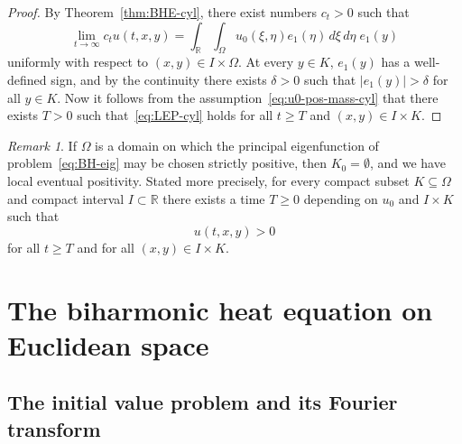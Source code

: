 \documentclass[a4paper, reqno,titlepage]{amsart}
\numberwithin{equation}{section}
\theoremstyle{plain}
\theoremstyle{definition}
\theoremstyle{remark}
\newtheorem{remark}[theorem]{Remark}
\newcommand{\RR}{\mathbb{R}}
\begin{document}
\begin{proof}
  By Theorem~\ref{thm:BHE-cyl}, there exist numbers $c_t > 0$ such that
  \begin{displaymath}
    \lim_{t \to \infty} c_t u(t,x,y) = \int_\RR \int_\Omega u_0(\xi, \eta) e_1(\eta) \,d\xi \,d\eta \; e_1(y)
  \end{displaymath}
  uniformly with respect to $(x,y) \in I \times \Omega$. At every $y \in K$, $e_1(y)$ has a well-defined sign, and by the continuity there exists $\delta>0$ such that $|e_1(y)|>\delta$ for all $y\in K$. Now it follows from the assumption~\eqref{eq:u0-pos-mass-cyl} that there exists $T>0$ such that~\eqref{eq:LEP-cyl} holds for all $t\geq T$ and $(x,y)\in I \times K$.
\end{proof}

\begin{remark}
  If $\Omega$ is a domain on which the principal eigenfunction of problem~\eqref{eq:BH-eig} may be chosen strictly positive, then $K_0 = \emptyset$, and we have local eventual positivity. Stated more precisely, for every compact subset $K \subseteq \Omega$ and compact interval $I \subset \RR$ there exists a time $T \geq 0$ depending on $u_0$ and $I \times K$ such that
  \begin{equation*}
    u(t,x,y) > 0
  \end{equation*}
  for all $t \geq T$ and for all $(x,y) \in I \times K$.
\end{remark}

\section{The biharmonic heat equation on Euclidean space}
\label{sec:BHE-Rn}

\subsection{The initial value problem and its Fourier transform}
\end{document}
